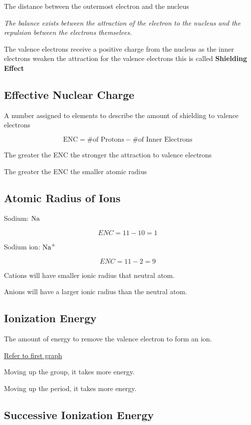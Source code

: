 \documentclass[12pt]{article}
\begin{document}
The distance between the outermost electron and the nucleus

\noindent \emph{The balance exists between the attraction of the electron to the nucleus and the repulsion between the electrons themselves.}

\medskip
\noindent The valence electrons receive a positive charge from the nucleus as the inner electrons weaken the attraction for the valence electrons this is called \textbf{Shielding Effect}

\subsection{Effective Nuclear Charge}

A number assigned to elements to describe the amount of shielding to valence electrons

$$\text{ENC}=\text{\# of Protons}-\text{\# of Inner Electrons}$$

The greater the ENC the stronger the attraction to valence electrons

The greater the ENC the smaller atomic radius

\subsection{Atomic Radius of Ions}

Sodium: $\ce{Na}$

$$ENC=11-10=1$$

\noindent Sodium ion: $\ce{Na^+}$

$$ENC = 11-2=9$$

\noindent Cations will have smaller ionic radius that neutral atom.

\noindent Anions will have a larger ionic radius than the neutral atom.

\subsection{Ionization Energy}

The amount of energy to remove the valence electron to form an ion. 

\href{http://www.vias.org/genchem/atomstruct_12433_05.html}{Refer to first graph}

\medskip
\noindent Moving up the group, it takes more energy.

\noindent Moving up the period, it takes more energy.

\subsection{Successive Ionization Energy}
\end{document}
